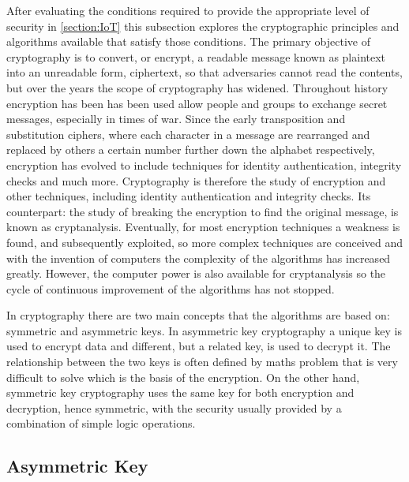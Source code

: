 \documentclass[12pt,twoside,a4paper]{report}
\begin{document}
	After evaluating the conditions required to provide the appropriate level of security  in \autoref{section:IoT} this subsection explores the cryptographic principles and algorithms available that satisfy those conditions. The primary objective of cryptography is to convert, or encrypt, a readable message known as plaintext into an unreadable form, ciphertext, so that adversaries cannot read the contents, but over the years the scope of cryptography has widened. Throughout history encryption has been has been used allow people and groups to exchange secret messages, especially in times of war. Since the early transposition and substitution ciphers, where each character in a message are rearranged and replaced by others a certain number further down the alphabet respectively, encryption has evolved to include techniques for identity authentication, integrity checks and much more. Cryptography is therefore the study of encryption and other techniques, including identity authentication and integrity checks. Its counterpart: the study of breaking the encryption to find the original message, is known as cryptanalysis\cite{AlfredJ.Menezes1996}. Eventually, for most encryption techniques a weakness is found, and subsequently exploited, so more complex techniques are conceived and with the invention of computers the complexity of the algorithms has increased greatly. However, the computer power is also available for cryptanalysis so the cycle of continuous improvement of the algorithms has not stopped.
    
	In cryptography there are two main concepts that the algorithms are based on: symmetric and asymmetric keys. In asymmetric key cryptography a unique key is used to encrypt data and different, but a related key, is used to decrypt it. The relationship between the two keys is often defined by maths problem that is very difficult to solve which is the basis of the encryption. On the other hand, symmetric key cryptography uses the same key for both encryption and decryption, hence symmetric, with the security usually provided by a combination of simple logic operations\cite{AlfredJ.Menezes1996}.
    
	\subsection{Asymmetric Key}
    
\end{document}

